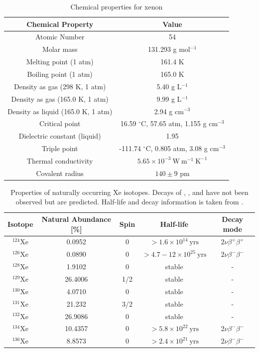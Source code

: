 \begin{table}[t]
 \centering
 \begin{tabular}{cc}
 \hline
 Chemical Property & Value \\
 \hline
 Atomic Number & 54 \\
 Molar mass & 131.293 g mol$^{-1}$ \\
 Melting point (1 atm) & 161.4 K \\
 Boiling point (1 atm) & 165.0 K \\
 Density as gas (298 K, 1 atm)  &  5.40 g L$^{-1}$ \\
 Density as gas (165.0 K, 1 atm)  &  9.99 g L$^{-1}$ \\
 Density as liquid (165.0 K, 1 atm) & 2.94 g cm$^{-3}$ \\
 Critical point & 16.59 $^{\circ}$C, 57.65 atm, 1.155 g cm$^{-3}$ \\
 Dielectric constant (liquid) & 1.95 \\
 Triple point & -111.74 $^{\circ}$C, 0.805 atm, 3.08 g cm$^{-3}$ \\
 Thermal conductivity & $5.65 \times 10^{-3}\ \mathrm{W\ m^{-1}\ K^{-1}}$ \\
 Covalent radius & $140 \pm 9$ pm \\
 \hline
 \end{tabular}
 \caption{Chemical properties for xenon}
\label{tab:xe_properties}
\end{table}


\begin{table}
 \centering
 \begin{tabular}{ccccc}
 \hline
 Isotope & Natural Abundance [\%] & Spin & Half-life & Decay mode \\
 \hline
 $^{124}$Xe & 0.0952 & 0 &  $> 1.6 \times 10^{14}\ \mathrm{yrs}$ & $2\nu \beta^{+} \beta^{+}$ \\
 $^{126}$Xe & 0.0890 & 0 & $> 4.7-12 \times 10^{25}\ \mathrm{yrs}$ & $2\nu \beta^{-} \beta^{-}$ \\
 $^{128}$Xe & 1.9102 & 0 & stable & - \\
 $^{129}$Xe & 26.4006 & 1/2 & stable & - \\
 $^{130}$Xe & 4.0710 & 0 & stable & - \\
 $^{131}$Xe & 21.232 & 3/2 & stable & - \\
 $^{132}$Xe & 26.9086 & 0 & stable & - \\
 $^{134}$Xe & 10.4357 & 0 &  $> 5.8 \times 10^{22}\ \mathrm{yrs}$ & $2\nu \beta^{-} \beta^{-}$ \\
 $^{136}$Xe & 8.8573 & 0 &  $> 2.4 \times 10^{21}\ \mathrm{yrs}$ & $2\nu \beta^{-} \beta^{-}$ \\
 \hline
 \end{tabular}
 \caption{Properties of naturally occurring Xe isotopes.  Decays of , , and  have not been observed
 but are predicted.  Half-life and decay information is taken from .}
\label{tab:xe_isotopes}
\end{table}


